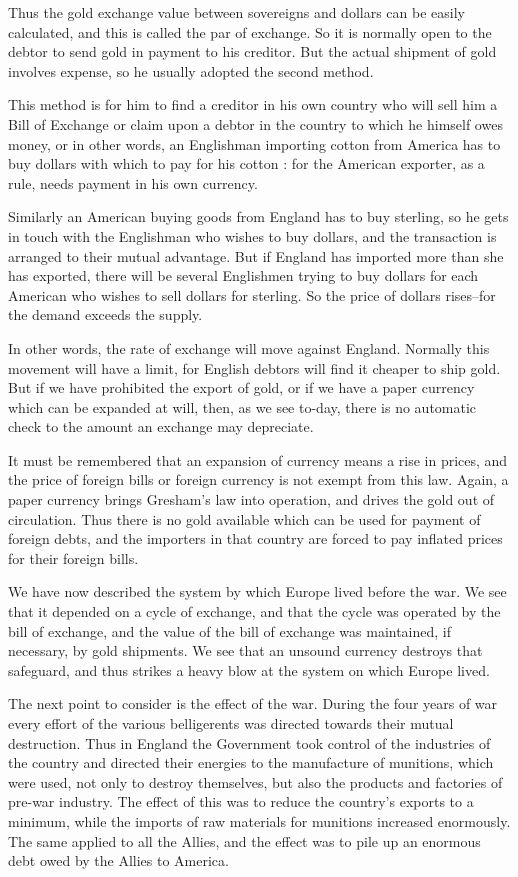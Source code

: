 \documentclass{book}
\begin{document}
Thus the gold exchange value between sovereigns and dollars can be easily calculated, and this is called the par of exchange. So it is normally open to the debtor to send gold in payment to his creditor. But the actual shipment of gold involves expense, so he usually adopted the second method.

This method is for him to find a creditor in his own country who will sell him a Bill of Exchange or claim upon a debtor in the country to which he himself owes money, or in other words, an Englishman importing cotton from America has to buy dollars with which to pay for his cotton : for the American exporter, as a rule, needs payment in his own currency.

Similarly an American buying goods from England has to buy sterling, so he gets in touch with the Englishman who wishes to buy dollars, and the transaction is arranged to their mutual advantage. But if England has imported more than she has exported, there will be several Englishmen trying to buy dollars for each American who wishes to sell dollars for sterling. So the price of dollars rises–for the demand exceeds the supply.

In other words, the rate of exchange will move against England. Normally this movement will have a limit, for English debtors will find it cheaper to ship gold. But if we have prohibited the export of gold, or if we have a paper currency which can be expanded at will, then, as we see to-day, there is no automatic check to the amount an exchange may depreciate.

It must be remembered that an expansion of currency means a rise in prices, and the price of foreign bills or foreign currency is not exempt from this law. Again, a paper currency brings Gresham’s law into operation, and drives the gold out of circulation. Thus there is no gold available which can be used for payment of foreign debts, and the importers in that country are forced to pay inflated prices for their foreign bills.

We have now described the system by which Europe lived before the war. We see that it depended on a cycle of exchange, and that the cycle was operated by the bill of exchange, and the value of the bill of exchange was maintained, if necessary, by gold shipments. We see that an unsound currency destroys that safeguard, and thus strikes a heavy blow at the system on which Europe lived.

The next point to consider is the effect of the war. During the four years of war every effort of the various belligerents was directed towards their mutual destruction. Thus in England the Government took control of the industries of the country and directed their energies to the manufacture of munitions, which were used, not only to destroy themselves, but also the products and factories of pre-war industry. The effect of this was to reduce the country’s exports to a minimum, while the imports of raw materials for munitions increased enormously. The same applied to all the Allies, and the effect was to pile up an enormous debt owed by the Allies to America.
\end{document}
